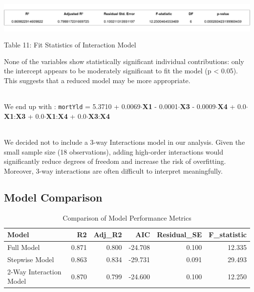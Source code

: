 \documentclass[
  11pt,
]{article}
\begin{document}
\includegraphics[width=1\linewidth]{interaction_model_fitstats.png}

\par

\small Table 11: Fit Statistics of Interaction Model

\addtocounter{table}{2}

\hfill\break
None of the variables show statistically significant individual
contributions: only the intercept appears to be moderately significant
to fit the model (p \textless{} 0.05). This suggests that a reduced
model may be more appropriate.\\
\strut \\
We end up with : \texttt{mortYld} = 5.3710 + 0.0069\(\cdot\)\textbf{X1}
- 0.0001\(\cdot\)\textbf{X3} - 0.0009\(\cdot\)\textbf{X4} +
0.0\(\cdot\)\textbf{X1}:\textbf{X3} +
0.0\(\cdot\)\textbf{X1}:\textbf{X4} +
0.0\(\cdot\)\textbf{X3}:\textbf{X4}\\
\strut \\
We decided not to include a 3-way Interactions model in our analysis.
Given the small sample size (18 observations), adding high-order
interactions would significantly reduce degrees of freedom and increase
the risk of overfitting. Moreover, 3-way interactions are often
difficult to interpret meaningfully.

\subsection{Model Comparison}\label{model-comparison}

\begingroup\fontsize{8}{10}\selectfont

\begin{longtable}[t]{lrrrrr}
\caption{\label{tab:unnamed-chunk-11}Comparison of Model Performance Metrics}\\
\toprule
Model & R2 & Adj\_R2 & AIC & Residual\_SE & F\_statistic\\
\midrule
Full Model & 0.871 & 0.800 & -24.708 & 0.100 & 12.335\\
Stepwise Model & 0.863 & 0.834 & -29.731 & 0.091 & 29.493\\
2-Way Interaction Model & 0.870 & 0.799 & -24.600 & 0.100 & 12.250\\
\bottomrule
\end{longtable}
\endgroup{}
\end{document}
